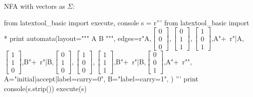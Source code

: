 NFA with vectors as $\Sigma$:
\begin{python}
from latextool_basic import execute, console
s = r'''
from latextool_basic import * 
print automata(layout="""
A      B
""",
edges=r"A,$\begin{bmatrix}0\\0\\0 \end{bmatrix},\begin{bmatrix}0\\1\\1 \end{bmatrix},\begin{bmatrix}1\\0\\1 \end{bmatrix}$,A"+\
r"|A,$\begin{bmatrix}1\\1\\0\end{bmatrix}$,B"+\
r"|B,$\begin{bmatrix}0\\1\\0\end{bmatrix},\begin{bmatrix}1\\0\\0\end{bmatrix},\begin{bmatrix}1\\1\\1\end{bmatrix}$,B"+\
r"|B,$\begin{bmatrix}0\\0\\1\end{bmatrix}$,A"+\
r"",
A="initial|accept|label=carry=0",
B="label=carry=1",
)
'''
print console(s.strip())
execute(s)
\end{python}

